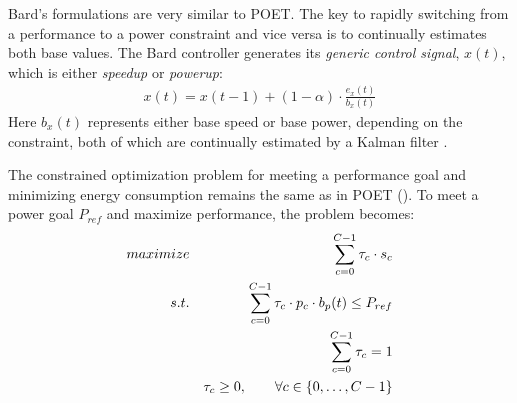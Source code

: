 Bard's formulations are very similar to POET.
The key to rapidly switching from a performance to a power constraint and vice versa is to continually estimates both base values.
The Bard controller generates its \emph{generic control signal}, $x(t)$, which is either \emph{speedup} or \emph{powerup}:
\begin{eqnarray}
  x(t) = x(t-1) + (1-\alpha) \cdot \frac{e_x(t)}{b_x(t)}
  \label{eqn:bard-xup-control}
\end{eqnarray}
Here $b_x(t)$ represents either base speed or base power, depending on the constraint, both of which are continually estimated by a Kalman filter \cite{welch2006kalman}.

The constrained optimization problem for meeting a performance goal and minimizing energy consumption remains the same as in POET ().
To meet a power goal $P_{ref}$ and maximize performance, the problem becomes:
\begin{eqnarray}
  \maximize && \sum_{c=0}^{C-1} \tau_c \cdot s_c \label{eqn:bard-timing} \\
  \st %
  && \sum_{c=0}^{C-1} \tau_c \cdot p_c \cdot b_p(t) \le P_{ref} \label{eqn:bard-power} \\
  && \sum_{c=0}^{C-1} \tau_c = 1 \label{eqn:work} \\
  && \tau_c \ge 0, \qquad \forall c \in \{0,\ldots,C-1\} \label{eqn:bard-time}
\end{eqnarray}

